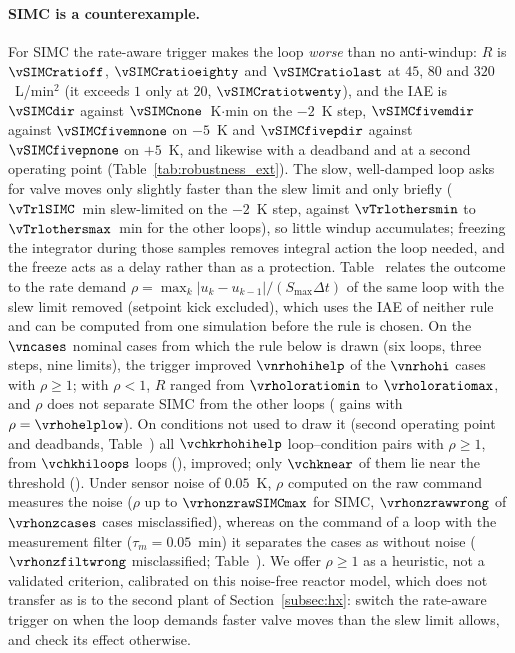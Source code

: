 \paragraph{SIMC is a counterexample.} For SIMC the rate-aware trigger makes the loop \emph{worse} than no anti-windup: $R$ is $\vSIMCratioff$, $\vSIMCratioeighty$ and $\vSIMCratiolast$ at $45$, $80$ and $320$~L/min$^2$ (it exceeds $1$ only at $20$, $\vSIMCratiotwenty$), and the IAE is $\vSIMCdir$ against $\vSIMCnone$~K$\cdot$min on the $-2$~K step, $\vSIMCfivemdir$ against $\vSIMCfivemnone$ on $-5$~K and $\vSIMCfivepdir$ against $\vSIMCfivepnone$ on $+5$~K, and likewise with a deadband and at a second operating point (Table~\ref{tab:robustness_ext}). The slow, well-damped loop asks for valve moves only slightly faster than the slew limit and only briefly ($\vTrlSIMC$~min slew-limited on the $-2$~K step, against $\vTrlothersmin$ to $\vTrlothersmax$~min for the other loops), so little windup accumulates; freezing the integrator during those samples removes integral action the loop needed, and the freeze acts as a delay rather than as a protection. Table~ relates the outcome to the rate demand $\rho = \max_k|u_k - u_{k-1}|/(S_{\max}\Delta t)$ of the same loop with the slew limit removed (setpoint kick excluded), which uses the IAE of neither rule and can be computed from one simulation before the rule is chosen. On the $\vncases$ nominal cases from which the rule below is drawn (six loops, three steps, nine limits), the trigger improved $\vnrhohihelp$ of the $\vnrhohi$ cases with $\rho \ge 1$; with $\rho < 1$, $R$ ranged from $\vrholoratiomin$ to $\vrholoratiomax$, and $\rho$ does not separate SIMC from the other loops (\vrhohelplowloop{} gains with $\rho = \vrhohelplow$). On conditions not used to draw it (second operating point and deadbands, Table~) all $\vchkrhohihelp$ loop--condition pairs with $\rho \ge 1$, from $\vchkhiloops$ loops (\vchkhilooplist{}), improved; only $\vchknear$ of them lie near the threshold (\vchknearlist{}). Under sensor noise of $0.05$~K, $\rho$ computed on the raw command measures the noise ($\rho$ up to $\vrhonzrawSIMCmax$ for SIMC, $\vrhonzrawwrong$ of $\vrhonzcases$ cases misclassified), whereas on the command of a loop with the measurement filter ($\tau_m = 0.05$~min) it separates the cases as without noise ($\vrhonzfiltwrong$ misclassified; Table~). We offer $\rho \ge 1$ as a heuristic, not a validated criterion, calibrated on this noise-free reactor model, which does not transfer as is to the second plant of Section~\ref{subsec:hx}: switch the rate-aware trigger on when the loop demands faster valve moves than the slew limit allows, and check its effect otherwise.




